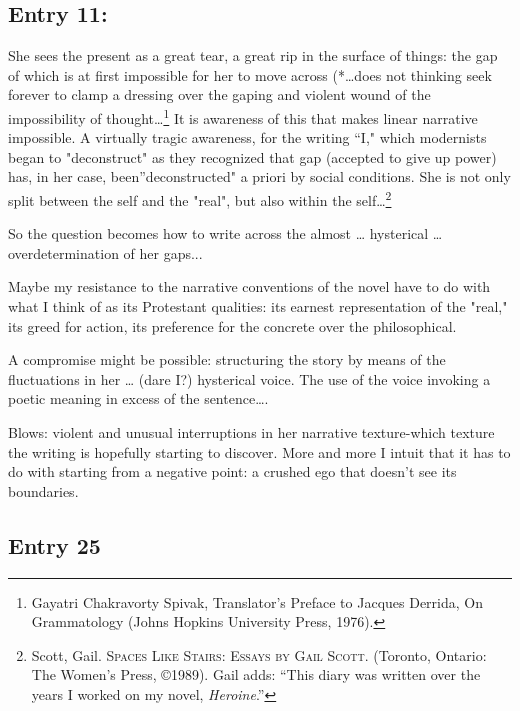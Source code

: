 \documentclass[
]{memoir}
\begin{document}
\hypertarget{entry-11}{%
\subsection*{Entry 11:}\label{entry-11}}

She sees the present as a great tear, a great rip in the surface of
things: the gap of which is at first impossible for her to move across
(*\ldots{}does not thinking seek forever to clamp a dressing over the
gaping and violent wound of the impossibility of
thought\ldots{}\footnote{Gayatri Chakravorty Spivak, Translator's
  Preface to Jacques Derrida, On Grammatology (Johns Hopkins University
  Press, 1976).} It is awareness of this that makes linear narrative
impossible. A virtually tragic awareness, for the writing ``I," which
modernists began to "deconstruct" as they recognized that gap (accepted
to give up power) has, in her case, been''deconstructed" a priori by
social conditions. She is not only split between the self and the
"real", but also within the self\ldots{}\footnote{Scott, Gail.
  \textsc{Spaces Like Stairs: Essays by Gail Scott}. (Toronto, Ontario:
  The Women's Press, ©1989). Gail adds: ``This diary was written over
  the years I worked on my novel, \emph{Heroine}.''}

So the question becomes how to write across the almost \ldots{}
hysterical \ldots{} overdetermination of her gaps...

Maybe my resistance to the narrative conventions of the novel have to do
with what I think of as its Protestant qualities: its earnest
representation of the "real," its greed for action, its preference for
the concrete over the philosophical.

A compromise might be possible: structuring the story by means of the
fluctuations in her \ldots{} (dare I?) hysterical voice. The use of the
voice invoking a poetic meaning in excess of the sentence\ldots{}.

Blows: violent and unusual interruptions in her narrative texture-which
texture the writing is hopefully starting to discover. More and more I
intuit that it has to do with starting from a negative point: a crushed
ego that doesn't see its boundaries.

\hypertarget{entry-25}{%
\subsection*{Entry 25}\label{entry-25}}
\end{document}

